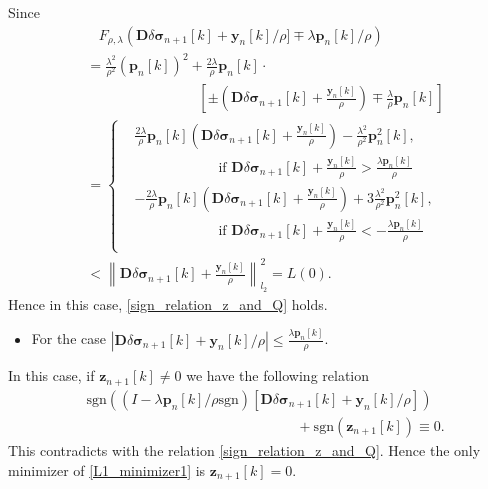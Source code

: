 \documentclass[lettersize,journal]{IEEEtran}
\def\y{\mathbf{y}}
\def\z{\mathbf{z}}
\def\D{\mathbf{D}}
\def\bfp{\mathbf{p}}
\def\f{\frac}
\def\bmsigma{\bm{\sigma}}
\newcommand{\sgn}[1]{\mathrm{sgn}(#1)}
\begin{document}
Since
\begin{equation*}
\begin{split}
&~~~~F_{\rho,\lambda}(\D\delta\bmsigma_{n+1}[k]+\y_n[k]/\rho]\mp \lambda \bfp_n[k]/\rho) \\
&= \f{\lambda^2}{\rho^2}(\bfp_n[k])^2 + \f{2\lambda}{\rho}\bfp_n[k]\cdot \\
&\qquad\qquad\qquad\qquad \left[\pm\left(\D\delta\bmsigma_{n+1}[k]+\f{\y_n[k]}{\rho}\right) \mp\f{\lambda}{\rho}\bfp_n[k]\right] \\
& =
\left\{
  \begin{split}
    & \f{2\lambda}{\rho}\bfp_n[k]\left(\D\delta\bmsigma_{n+1}[k]+\f{\y_n[k]}{\rho}\right)-\f{\lambda^2}{\rho^2}\bfp_n^2[k],\\
    &\qquad\qquad\qquad \mbox{if } \D\delta\bmsigma_{n+1}[k]+\f{\y_n[k]}{\rho}>\f{\lambda\bfp_n[k]}{\rho}\\
    & -\f{2\lambda}{\rho}\bfp_n[k]\left(\D\delta\bmsigma_{n+1}[k]+\f{\y_n[k]}{\rho}\right)+3\f{\lambda^2}{\rho^2}\bfp_n^2[k],\\
    &\qquad\qquad\qquad \mbox{if } \D\delta\bmsigma_{n+1}[k]+\f{\y_n[k]}{\rho}<-\f{\lambda\bfp_n[k]}{\rho}\\
  \end{split}
\right. \\
&<\left\|\D\delta\bmsigma_{n+1}[k]+\f{\y_n[k]}{\rho}\right\|_{l_2}^2 = L(0).
\end{split}
\end{equation*}
Hence in this case, \eqref{sign_relation_z_and_Q} holds.

\begin{itemize}
\item For the case $|\D\delta\bmsigma_{n+1}[k]+\y_n[k]/\rho|\leq \f{\lambda \bfp_n[k]}{\rho}$.
\end{itemize}
In this case, if $\z_{n+1}[k]\neq 0$ we have the following relation
\begin{equation*}
\begin{split}
& \sgn{(I - \lambda \bfp_n[k]/\rho\mbox{sgn})[\D\delta\bmsigma_{n+1}[k]+\y_n[k]/\rho]}\\
&\qquad\qquad \qquad\qquad\qquad\qquad\qquad\quad+\sgn{\z_{n+1}[k]}\equiv 0.
\end{split}
\end{equation*}
This contradicts with the relation \eqref{sign_relation_z_and_Q}. Hence the only minimizer of \eqref{L1_minimizer1} is $\z_{n+1}[k] = 0$.
\end{document}
